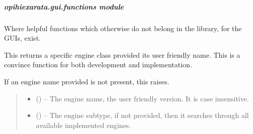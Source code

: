 \documentclass[letterpaper,11pt,english]{sphinxmanual}
\begin{document}
\sphinxstepscope


\subparagraph{opihiexarata.gui.functions module}
\label{\detokenize{code/opihiexarata.gui.functions:module-opihiexarata.gui.functions}}\label{\detokenize{code/opihiexarata.gui.functions:opihiexarata-gui-functions-module}}\label{\detokenize{code/opihiexarata.gui.functions::doc}}
\sphinxAtStartPar
Where helpful functions which otherwise do not belong in the library,
for the GUIs, exist.

\begin{savenotes}\begin{fulllineitems}
\label{\detokenize{code/opihiexarata.gui.functions:opihiexarata.gui.functions.pick_engine_class_from_name}}
\pysigstartsignatures
{}
\pysigstopsignatures
\sphinxAtStartPar
This returns a specific engine class provided its user friendly name.
This is a convince function for both development and implementation.

\sphinxAtStartPar
If an engine name provided is not present, this raises.
\begin{quote}\begin{description}
\begin{itemize}
\item {} 
\sphinxAtStartPar
{} () – The engine name, the user friendly version. It is case insensitive.

\item {} 
\sphinxAtStartPar
{} ({\hyperref[\detokenize{code/opihiexarata.library.engine:opihiexarata.library.engine.ExarataEngine}]{}}) – The engine subtype, if not provided, then it searches through all
available implemented engines.


\end{itemize}
\end{description}
\end{quote}
\end{fulllineitems}
\end{savenotes}
\end{document}
